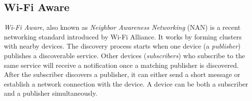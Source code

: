 
\subsection{Wi-Fi Aware}

\textit{Wi-Fi Aware}, also known as \textit{Neighbor Awareness Networking} (NAN) is a recent networking standard introduced by Wi-Fi Alliance. \cite{wifiaware} It works by forming clusters with nearby devices. The discovery process starts when one device (a \textit{publisher}) publishes a discoverable service. Other devices (\textit{subscribers}) who subscribe to the same service will receive a notification once a matching publisher is discovered. After the subscriber discovers a publisher, it can either send a short message or establish a network connection with the device. A device can be both a subscriber and a publisher simultaneously.



